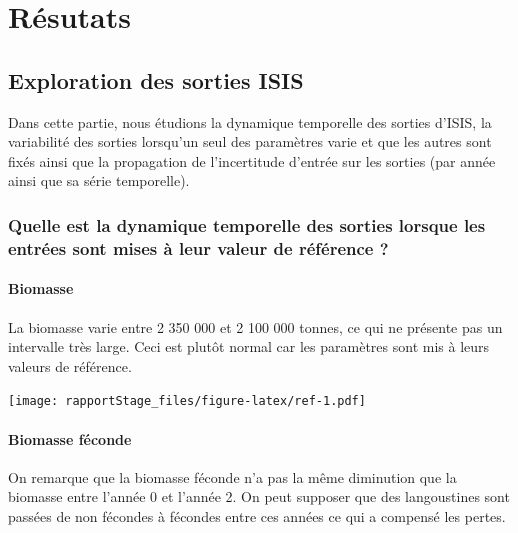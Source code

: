 \documentclass[
]{article}
\begin{document}
\newpage

\hypertarget{ruxe9sutats}{%
\section{Résutats}\label{ruxe9sutats}}

\hypertarget{exploration-des-sorties-isis}{%
\subsection{Exploration des sorties
ISIS}\label{exploration-des-sorties-isis}}

Dans cette partie, nous étudions la dynamique temporelle des sorties
d'ISIS, la variabilité des sorties lorsqu'un seul des paramètres varie
et que les autres sont fixés ainsi que la propagation de l'incertitude
d'entrée sur les sorties (par année ainsi que sa série temporelle).

\hypertarget{quelle-est-la-dynamique-temporelle-des-sorties-lorsque-les-entruxe9es-sont-mises-uxe0-leur-valeur-de-ruxe9fuxe9rence}{%
\subsubsection{Quelle est la dynamique temporelle des sorties lorsque
les entrées sont mises à leur valeur de référence
?}\label{quelle-est-la-dynamique-temporelle-des-sorties-lorsque-les-entruxe9es-sont-mises-uxe0-leur-valeur-de-ruxe9fuxe9rence}}

\hypertarget{biomasse}{%
\paragraph{Biomasse}\label{biomasse}}

La biomasse varie entre 2 350 000 et 2 100 000 tonnes, ce qui ne
présente pas un intervalle très large. Ceci est plutôt normal car les
paramètres sont mis à leurs valeurs de référence.

\texttt{[image: rapportStage\_files/figure-latex/ref-1.pdf]}

\hypertarget{biomasse-fuxe9conde}{%
\paragraph{Biomasse féconde}\label{biomasse-fuxe9conde}}

On remarque que la biomasse féconde n'a pas la même diminution que la
biomasse entre l'année 0 et l'année 2. On peut supposer que des
langoustines sont passées de non fécondes à fécondes entre ces années ce
qui a compensé les pertes.
\end{document}
